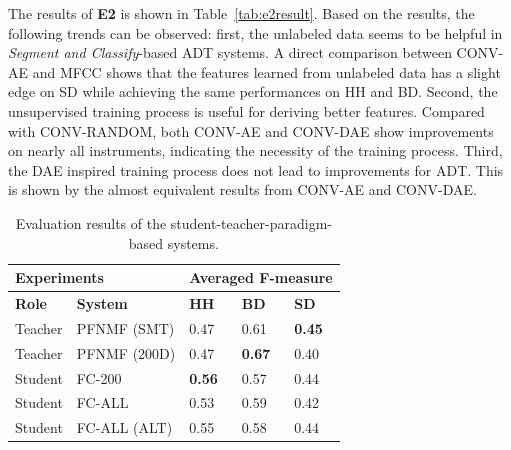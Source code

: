 \documentclass{article}
\begin{document}
The results of \textbf{E2} is shown in Table~\ref{tab:e2result}. Based on the results, the following trends can be observed: first, the unlabeled data seems to be helpful in \textit{Segment and Classify}-based ADT systems. A direct comparison between CONV-AE and MFCC shows that the features learned from unlabeled data has a slight edge on SD while achieving the same performances on HH and BD. Second, the unsupervised training process is useful for deriving better features. Compared with CONV-RANDOM, both CONV-AE and CONV-DAE show improvements on nearly all instruments, indicating the necessity of the training process. Third, the DAE inspired training process does not lead to improvements for ADT. This is shown by the almost equivalent results from CONV-AE and CONV-DAE.

\begin{table}[]
\centering
\begin{tabular}{lllll}
\hline
\multicolumn{2}{l}{\textbf{Experiments}}                    & \multicolumn{3}{l}{\textbf{Averaged F-measure}} \\ \hline
\textbf{Role} & \multicolumn{1}{l|}{\textbf{System}}        & \textbf{HH}    & \textbf{BD}    & \textbf{SD}   \\ \hline
Teacher       & \multicolumn{1}{l|}{PFNMF (SMT)}            & 0.47           & 0.61           & \textbf{0.45} \\
Teacher       & \multicolumn{1}{l|}{PFNMF (200D)}           & 0.47           & \textbf{0.67}  & 0.40          \\
Student       & \multicolumn{1}{l|}{FC-200}                & \textbf{0.56}  & 0.57           & 0.44          \\
Student       & \multicolumn{1}{l|}{FC-ALL}               & 0.53           & 0.59           & 0.42          \\
Student       & \multicolumn{1}{l|}{FC-ALL (ALT)} & 0.55           & 0.58           & 0.44          \\ \hline
\end{tabular}
\caption{Evaluation results of the student-teacher-paradigm-based systems.}
\label{tab:e3result}
\end{table}
\end{document}
